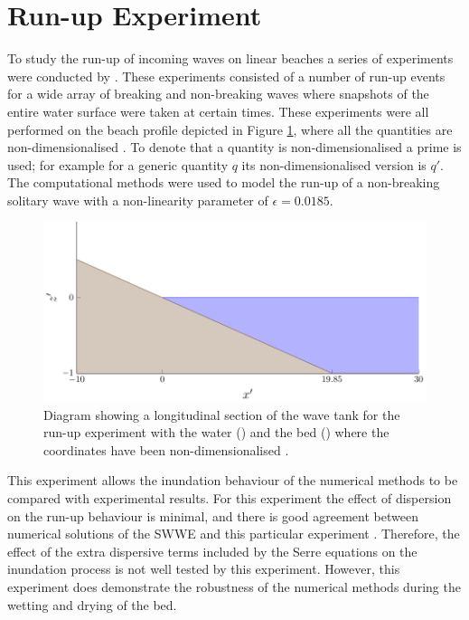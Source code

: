 \section{Run-up Experiment}
To study the run-up of incoming waves on linear beaches a series of experiments were conducted by \citet{Synolakis-1987-523}. These experiments consisted of a number of run-up events for a wide array of breaking and non-breaking waves where snapshots of the entire water surface were taken at certain times. These experiments were all performed on the beach profile depicted in Figure \ref{fig:SynolakisWT}, where all the quantities are non-dimensionalised \cite{Synolakis-1987-523}. To denote that a quantity is non-dimensionalised a prime is used; for example for a generic quantity $q$ its non-dimensionalised version is $q'$. The computational methods were used to model the run-up of a non-breaking solitary wave with a non-linearity parameter of $\epsilon = 0.0185$.
\begin{figure}
	\centering
	\includegraphics[width=\textwidth]{./chp6/figures/Experiment/Synolakis/WavetankArtifical.pdf}
	\caption{Diagram showing a longitudinal section of the wave tank for the run-up experiment with the water () and the bed () where the coordinates have been non-dimensionalised \cite{Synolakis-1987-523}.}
	\label{fig:SynolakisWT}
\end{figure}

This experiment allows the inundation behaviour of the numerical methods to be compared with experimental results. For this experiment the effect of dispersion on the run-up behaviour is minimal, and there is good agreement between numerical solutions of the SWWE and this particular experiment \cite{Bollermann-etal-2011-271}. Therefore, the effect of the extra dispersive terms included by the Serre equations on the inundation process is not well tested by this experiment. However, this experiment does demonstrate the robustness of the numerical methods during the wetting and drying of the bed. 

